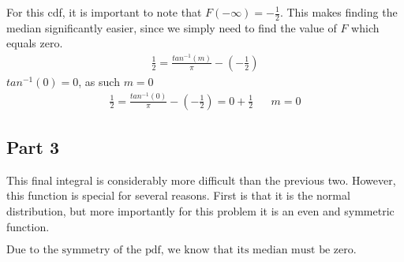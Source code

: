 \documentclass{article}
\begin{document}
For this cdf, it is important to note that $F(-\infty)=-\frac{1}{2}$. This makes finding the median significantly easier, since we simply need to find the value of $F$ which equals zero.
\begin{align*}
\frac{1}{2} = \frac{tan^{-1}(m)}{\pi} - (-\frac{1}{2})
\end{align*}
$tan^{-1}(0) = 0$, as such $m=0$
\begin{align*}
\frac{1}{2} = \frac{tan^{-1}(0)}{\pi} - (-\frac{1}{2}) = 0+\frac{1}{2} && \boxed{m = 0}
\end{align*}

\subsection*{Part 3}
This final integral is considerably more difficult than the previous two. However, this function is special for several reasons. First is that it is the normal distribution, but more importantly for this problem it is an even and symmetric function.

$\boxed{\text{Due to the symmetry of the pdf, we know that its median must be zero.}}$
\end{document}
